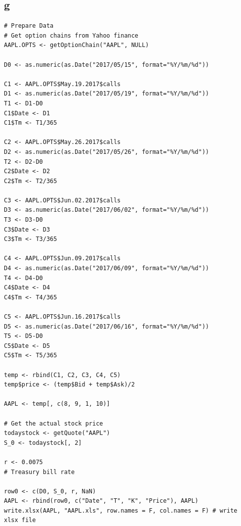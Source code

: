 \documentclass{article}
\begin{document}
\subsection{g}
\begin{verbatim}
# Prepare Data
# Get option chains from Yahoo finance
AAPL.OPTS <- getOptionChain("AAPL", NULL)

D0 <- as.numeric(as.Date("2017/05/15", format="%Y/%m/%d"))

C1 <- AAPL.OPTS$May.19.2017$calls
D1 <- as.numeric(as.Date("2017/05/19", format="%Y/%m/%d"))
T1 <- D1-D0
C1$Date <- D1
C1$Tm <- T1/365

C2 <- AAPL.OPTS$May.26.2017$calls
D2 <- as.numeric(as.Date("2017/05/26", format="%Y/%m/%d"))
T2 <- D2-D0
C2$Date <- D2
C2$Tm <- T2/365

C3 <- AAPL.OPTS$Jun.02.2017$calls
D3 <- as.numeric(as.Date("2017/06/02", format="%Y/%m/%d"))
T3 <- D3-D0
C3$Date <- D3
C3$Tm <- T3/365

C4 <- AAPL.OPTS$Jun.09.2017$calls
D4 <- as.numeric(as.Date("2017/06/09", format="%Y/%m/%d"))
T4 <- D4-D0
C4$Date <- D4
C4$Tm <- T4/365

C5 <- AAPL.OPTS$Jun.16.2017$calls
D5 <- as.numeric(as.Date("2017/06/16", format="%Y/%m/%d"))
T5 <- D5-D0
C5$Date <- D5
C5$Tm <- T5/365

temp <- rbind(C1, C2, C3, C4, C5)
temp$price <- (temp$Bid + temp$Ask)/2

AAPL <- temp[, c(8, 9, 1, 10)]

# Get the actual stock price
todaystock <- getQuote("AAPL") 
S_0 <- todaystock[, 2]

r <- 0.0075
# Treasury bill rate

row0 <- c(D0, S_0, r, NaN)
AAPL <- rbind(row0, c("Date", "T", "K", "Price"), AAPL)
write.xlsx(AAPL, "AAPL.xls", row.names = F, col.names = F) # write xlsx file
\end{verbatim}
\end{document}
